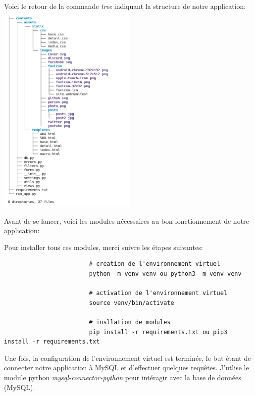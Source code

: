 \documentclass[a4paper,11pt]{article}
\begin{document}
                \noindent Voici le retour de la commande \textit{tree} indiquant la structure de notre application:\\
                \includegraphics[width=0.5\textwidth]{CHAPITRE-5/5.1-A-RENDRE/screenshots/screen1.png}

                \newpage
                \noindent Avant de se lancer, voici les modules nécessaires au bon fonctionnement de notre application: 
                

                \noindent Pour installer tous ces modules, merci suivre les étapes suivantes:
                \begin{tcolorbox}[colback=lightgray!6, colframe=black, left=-30mm, right=5mm, top=2mm, bottom=-2mm, boxrule=0.1mm]
                    \begin{verbatim}
                        # creation de l'environnement virtuel
                        python -m venv venv ou python3 -m venv venv

                        # activation de l'environnement virtuel
                        source venv/bin/activate

                        # insllation de modules
                        pip install -r requirements.txt ou pip3 install -r requirements.txt
                    \end{verbatim}
                \end{tcolorbox}

                \noindent Une fois, la configuration de l'environnement virtuel est terminée, le but étant de connecter notre application à MySQL et d'effectuer quelques requêtes. J'utlise le module python 
                \textit{mysql-connector-python} pour intéragir avec la base de données (MySQL). 
                
\end{document}
